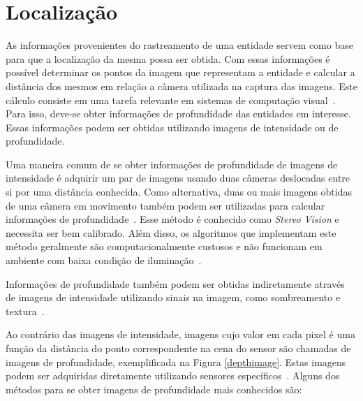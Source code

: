 \section{Localização}
\label{sec:luz-estruturada}

	As informações provenientes do rastreamento de uma entidade servem como base para que a localização da mesma possa ser obtida. Com essas informações é possível determinar os pontos da imagem que representam a entidade e calcular a distância dos mesmos em relação a câmera utilizada na captura das imagens. Este cálculo consiste em uma tarefa relevante em sistemas de computação visual~\cite{jain}. Para isso,
	deve-se obter informações de profundidade das entidades em interesse. Essas
	informações podem ser obtidas utilizando imagens de intensidade ou de
	profundidade.
	
	Uma maneira comum de se obter informações de profundidade de imagens de
	intensidade é adquirir um par de imagens usando duas câmeras deslocadas entre si
	por uma distância conhecida. Como alternativa, duas ou mais imagens obtidas de
	uma câmera em movimento também podem ser utilizadas para calcular informações de
	profundidade~\cite{jain}. Esse método é conhecido como \textit{Stereo Vision} e
	necessita ser bem calibrado.  Além disso, os algoritmos que implementam este método
	geralmente são computacionalmente custosos e não funcionam em ambiente com baixa
	condição de iluminação~\cite{fall-detection}.
	
	Informações de profundidade também podem ser obtidas indiretamente através de
	imagens de intensidade utilizando sinais na imagem, como sombreamento e
	textura~\cite{jain}.
	
	Ao contrário das imagens de intensidade, imagens cujo valor em cada pixel é uma
	função da distância do ponto correspondente na cena do sensor são chamadas de
	imagens de profundidade, exemplificada na Figura \ref{depthimage}. Estas imagens
	podem ser adquiridas diretamente utilizando sensores específicos~\cite{jain}.
	Alguns dos métodos para se obter imagens de profundidade mais conhecidos são:

